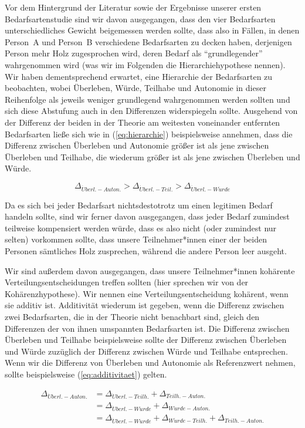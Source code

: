 \documentclass[justified,nobib,symmetric,twoside]{tufte-handout}
\begin{document}
Vor dem Hintergrund der Literatur sowie der Ergebnisse unserer ersten Bedarfsartenstudie sind wir davon ausgegangen, dass den vier Bedarfsarten unterschiedliches Gewicht beigemessen werden sollte, dass also in Fällen, in denen Person~A und Person~B verschiedene Bedarfsarten zu decken haben, derjenigen Person mehr Holz zugesprochen wird, deren Bedarf als \enquote{grundlegender} wahrgenommen wird (was wir im Folgenden die Hierarchiehypothese nennen).
Wir haben dementsprechend erwartet, eine Hierarchie der Bedarfsarten zu beobachten, wobei Überleben, Würde, Teilhabe und Autonomie in dieser Reihenfolge als jeweils weniger grundlegend wahrgenommen werden sollten und sich diese Abstufung auch in den Differenzen widerspiegeln sollte.
Ausgehend von der Differenz der beiden in der Theorie am weitesten voneinander entfernten Bedarfsarten ließe sich wie in (\ref{eq:hierarchie}) beispielsweise annehmen, dass die Differenz zwischen Überleben und Autonomie größer ist als jene zwischen Überleben und Teilhabe, die wiederum größer ist als jene zwischen Überleben und Würde.

\begin{equation}\label{eq:hierarchie}
   \Delta_{\ddot{U}berl.-Auton.}>\Delta_{\ddot{U}berl.-Teil.}>\Delta_{\ddot{U}berl.-W\ddot{u}rde}
\end{equation}

Da es sich bei jeder Bedarfsart nichtsdestotrotz um einen legitimen Bedarf handeln sollte, sind wir ferner davon ausgegangen, dass jeder Bedarf zumindest teilweise kompensiert werden würde, dass es also nicht (oder zumindest nur selten) vorkommen sollte, dass unsere Teilnehmer*innen einer der beiden Personen sämtliches Holz zusprechen, während die andere Person leer ausgeht.

Wir sind außerdem davon ausgegangen, dass unsere Teilnehmer*innen kohärente Verteilungsentscheidungen treffen sollten (hier sprechen wir von der Kohärenz\-hypothese).
Wir nennen eine Verteilungsentscheidung kohärent, wenn sie additiv ist.
Additivität wiederum ist gegeben, wenn die Differenz zwischen zwei Bedarfsarten, die in der Theorie nicht benachbart sind, gleich den Differenzen der von ihnen umspannten Bedarfsarten ist.
Die Differenz zwischen Überleben und Teilhabe beispielsweise sollte der Differenz zwischen Überleben und Würde zuzüglich der Differenz zwischen Würde und Teilhabe entsprechen.
Wenn wir die Differenz von Überleben und Autonomie als Referenzwert nehmen, sollte beispielsweise (\ref{eq:additivitaet}) gelten.

\begin{equation}\label{eq:additivitaet}
   \begin{split}
   \Delta_{\ddot{U}berl.-Auton.} & = \Delta_{\ddot{U}berl.-Teilh.} + \Delta_{Teilh.-Auton.} \\
                                 & = \Delta_{\ddot{U}berl.-W\ddot{u}rde} + \Delta_{W\ddot{u}rde-Auton.} \\
                                 & = \Delta_{\ddot{U}berl.-W\ddot{u}rde} + \Delta_{W\ddot{u}rde-Teilh.} + \Delta_{Teilh.-Auton.}
   \end{split}
\end{equation}
\end{document}
